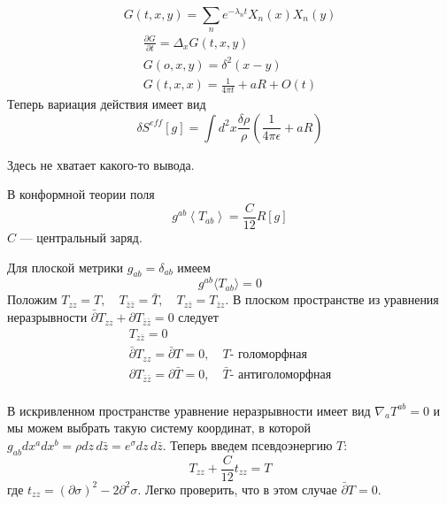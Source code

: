 \documentclass[a4paper,12pt]{article}
\theoremstyle{definition} \newtheorem{Def}{Definition}
\begin{document}
\begin{equation}
  \label{eq:43}
  G(t,x,y)=\sum_n e^{-\lambda_n t}X_n(x) X_n(y)
\end{equation}
\begin{equation}
  \label{eq:44}
  \begin{split}
    \frac{\partial G}{\partial t}=\Delta_x G(t,x,y)\\
    G(o,x,y)=\delta^2 (x-y)\\
    G(t,x,x)=\frac{1}{4\pi t}+aR+O(t)
  \end{split}
\end{equation}
Теперь вариация действия имеет вид
\begin{equation}
  \label{eq:45}
  \delta S^{eff}[g]=\int d^2x \frac{\delta\rho}{\rho}\left(\frac{1}{4\pi\epsilon}+aR\right)
\end{equation}

Здесь не хватает какого-то вывода.

В конформной теории поля
\begin{equation}
  \label{eq:46}
  g^{ab}\left<T_{ab}\right>=\frac{C}{12}R[g]
\end{equation}
$C$ --- центральный заряд.

Для плоской метрики $g_{ab}=\delta_{ab}$ имеем
\begin{equation}
  \label{eq:47}
  g^{ab}\langle T_{ab} \rangle=0
\end{equation}
Положим $T_{zz}=T,\quad T_{\bar{z}\bar{z}}=\bar{T},\quad T_{z\bar{z}}=T_{\bar{z}z}$. В плоском пространстве из уравнения неразрывности $\bar{\partial}T_{zz}+\partial T_{\bar{z}\bar{z}}=0$ следует
\begin{equation}
  \label{eq:49}
  \begin{split}
    T_{z\bar{z}}=0\\
    \bar{\partial}T_{zz}=\bar{\partial}T=0,\quad T \mbox{- голоморфная}\\
    \partial T_{\bar{z}\bar{z}}=\partial \bar{T}=0,\quad \bar{T} \mbox{- антиголоморфная}\\
  \end{split}
\end{equation}

В искривленном пространстве уравнение неразрывности имеет вид $\nabla_a T^{ab}=0$ и мы можем выбрать такую систему координат, в которой $g_{ab}dx^a dx^b = \rho dz\, d\bar{z}=e^{\sigma}dz\,d\bar{z}$. Теперь введем псевдоэнергию $T$:
\begin{equation}
  \label{eq:50}
  T_{zz}+\frac{C}{12}t_{zz}=T
\end{equation}
где $t_{zz}=(\partial \sigma)^2-2\partial^2 \sigma$. Легко проверить, что в этом случае $\bar{\partial}T=0$.
\end{document}
